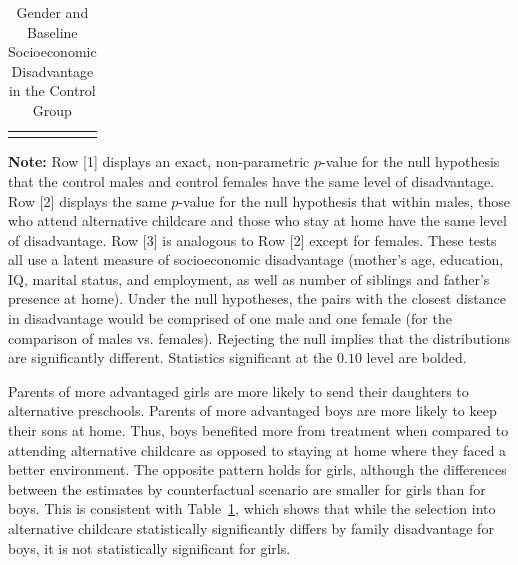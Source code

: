\begin{table}[!htpb]
\begin{threeparttable}
\caption{Gender and Baseline Socioeconomic Disadvantage in the Control Group} \label{table:disadtests}
\centering
\begin{tabularx}{16.5cm}{XcX}
&  &
\end{tabularx}
\begin{tablenotes}
\footnotesize
\item \textbf{Note:} Row [1] displays an exact, non-parametric $p$-value for the null hypothesis that the control males and control females have the same level of disadvantage. Row [2] displays the same $p$-value for the null  hypothesis that within males, those who attend alternative childcare and those who stay at home have the same level of disadvantage. Row [3] is analogous to Row [2] except for females. These tests all use a latent measure of socioeconomic disadvantage (mother's age, education, IQ, marital status, and employment, as well as number of siblings and father's presence at home). Under the null hypotheses, the pairs with the closest distance in disadvantage would be comprised of one male and one female (for the comparison of males vs. females). Rejecting the null implies that the distributions are significantly different. Statistics significant at the $0.10$ level are bolded.
\end{tablenotes}
\end{threeparttable}
\end{table}

Parents of more advantaged girls are more likely to send their daughters to alternative preschools. Parents of more advantaged boys are more likely to keep their sons at home. Thus, boys benefited more from treatment when compared to attending alternative childcare as opposed to staying at home where they faced a better environment. The opposite pattern holds for girls, although the differences between the estimates by counterfactual scenario are smaller for girls than for boys. This is consistent with Table~\ref{table:disadtests}, which shows that while the selection into alternative childcare statistically significantly differs by family disadvantage for boys, it is not statistically significant for girls. 
